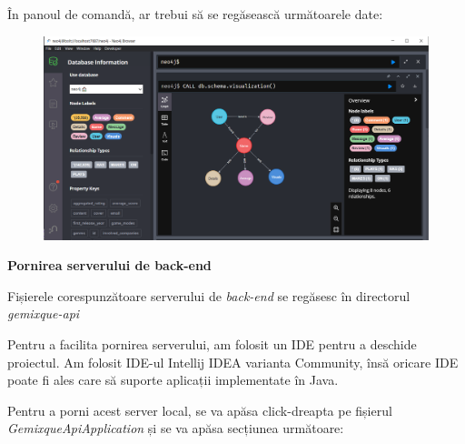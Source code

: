 \documentclass[12pt,a4paper]{report}
\begin{document}
\begin{enumerate}
\newpage
În panoul de comandă, ar trebui să se regăsească următoarele date:

        \begin{figure}[H]
\centering
\caption{}
\begin{adjustbox}{max size={\textwidth}{\textheight}}
\includegraphics[scale=1]{exemplu_48_verificare}
\end{adjustbox}
\caption*{}
\end{figure}
  
  
\end{enumerate}

\bigskip
\textbf{Pornirea serverului de back-end}
\bigskip

Fișierele corespunzătoare serverului de \emph{back-end} se regăsesc în directorul \emph{gemixque-api}

Pentru a facilita pornirea serverului, am folosit un IDE pentru a deschide proiectul. Am folosit IDE-ul Intellij IDEA varianta Community, însă oricare IDE poate fi ales care să suporte aplicații implementate în Java.

Pentru a porni acest server local, se va apăsa click-dreapta pe fișierul \emph{GemixqueApiApplication} și se va apăsa secțiunea următoare:
\end{document}
